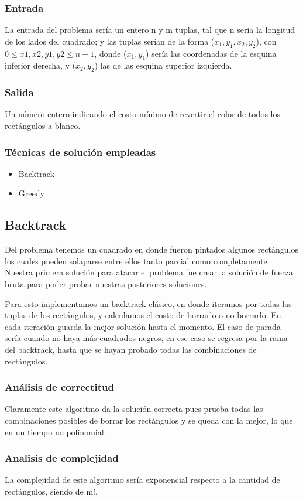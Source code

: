 \documentclass{article}
\begin{document}
	\subsubsection{Entrada}
	La entrada del problema sería un entero n y m tuplas, tal que n sería la longitud de los lados del cuadrado; y las tuplas serían de la forma ($x_1, y_1, x_2, y_2$), con $0 \leq x1, x2, y1, y2 \leq n-1$, donde ($x_1, y_1$) sería las coordenadas de la esquina inferior derecha, y ($x_2, y_2$) las de las esquina superior izquierda.
	\subsubsection{Salida}
	Un número entero indicando el costo mínimo de revertir el color de todos los rectángulos a blanco.
	\subsubsection{Técnicas de solución empleadas}
	\begin{itemize}
	\item Backtrack
	\item Greedy
	\end{itemize}
	
	\subsection{Backtrack}
	Del problema tenemos un cuadrado en donde fueron pintados algunos rectángulos los cuales pueden solaparse entre ellos tanto parcial como completamente. Nuestra primera solución para atacar el problema fue crear la solución de fuerza bruta para poder probar nuestras posteriores soluciones. 
	
	Para esto implementamos un backtrack clásico, en donde iteramos por todas las tuplas de los rectángulos, y calculamos el costo de borrarlo o no borrarlo. En cada iteración guarda la mejor solución hasta el momento. El caso de parada sería cuando no haya más cuadrados negros, en ese caso se regresa por la rama del backtrack, hasta que se hayan probado todas las combinaciones de rectángulos.
	\subsubsection{Análisis de correctitud}
	Claramente este algoritmo da la solución correcta pues prueba todas las combinaciones posibles de borrar los rectángulos y se queda con la mejor, lo que en un tiempo no polinomial.
	\subsubsection{Analisis de complejidad}
	La complejidad de este algoritmo sería exponencial respecto a la cantidad de rectángulos, siendo de m!.
\end{document}
